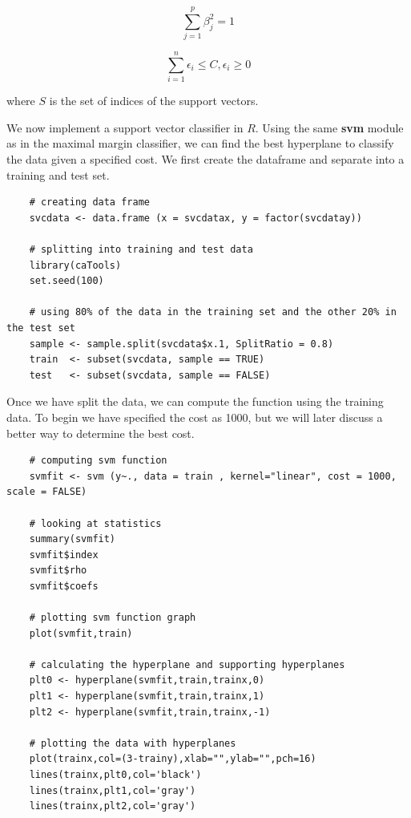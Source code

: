 \documentclass[12pt]{article}
\begin{document}
\begin{equation}
\sum_{j=1}^{p} \beta^2_j=1
\end{equation}

\begin{equation} \label{slackvariables}
\sum_{i=1}^{n} \epsilon_i \le C, \epsilon_i \ge 0
\end{equation}

where \(S\) is the set of indices of the support vectors.

We now implement a support vector classifier in $R$. Using the same \textbf{svm} module as in the maximal margin classifier, we can find the best hyperplane to classify the data given a specified cost. We first create the dataframe and separate into a training and test set.

\begin{verbatim}
    # creating data frame 
    svcdata <- data.frame (x = svcdatax, y = factor(svcdatay))
    
    # splitting into training and test data
    library(caTools)
    set.seed(100)
    
    # using 80% of the data in the training set and the other 20% in the test set
    sample <- sample.split(svcdata$x.1, SplitRatio = 0.8)
    train  <- subset(svcdata, sample == TRUE)
    test   <- subset(svcdata, sample == FALSE)
\end{verbatim}

Once we have split the data, we can compute the function using the training data. To begin we have specified the cost as 1000, but we will later discuss a better way to determine the best cost.

\begin{verbatim}
    # computing svm function
    svmfit <- svm (y~., data = train , kernel="linear", cost = 1000, scale = FALSE)
    
    # looking at statistics
    summary(svmfit)
    svmfit$index
    svmfit$rho
    svmfit$coefs
    
    # plotting svm function graph
    plot(svmfit,train)
    
    # calculating the hyperplane and supporting hyperplanes
    plt0 <- hyperplane(svmfit,train,trainx,0)
    plt1 <- hyperplane(svmfit,train,trainx,1)
    plt2 <- hyperplane(svmfit,train,trainx,-1)
    
    # plotting the data with hyperplanes
    plot(trainx,col=(3-trainy),xlab="",ylab="",pch=16)
    lines(trainx,plt0,col='black')
    lines(trainx,plt1,col='gray')
    lines(trainx,plt2,col='gray')
    
\end{verbatim}
\end{document}
